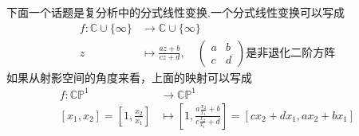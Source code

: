 下面一个话题是复分析中的分式线性变换.一个分式线性变换可以写成
\begin{align*}
    f: \mathbb{C}\cup\{\infty\} &\to \mathbb{C}\cup\{\infty\} \\
    z &\mapsto \frac{az+b}{cz+d},\quad \begin{pmatrix}
        a & b \\
        c & d
    \end{pmatrix}\text{是非退化二阶方阵}
\end{align*}
如果从射影空间的角度来看，上面的映射可以写成
\begin{align*}
    f: \mathbb{C}\mathbb{P}^1 &\to \mathbb{C}\mathbb{P}^1 \\
    [x_1,x_2]=\left[1,\frac{x_2}{x_1}\right] &\mapsto \left[1,\frac{a\tfrac{x_2}{x_1}+b}{c\tfrac{x_2}{x_1}+d}\right] = [cx_2+dx_1,ax_2+bx_1]
\end{align*}
